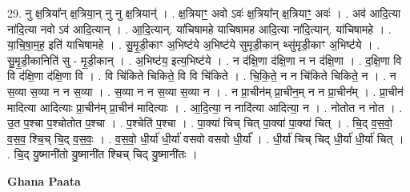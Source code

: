 \documentclass[17pt]{extarticle}
\begin{document}
29. नु क्ष॒त्रिया᳚न् क्ष॒त्रिया॒न् नु नु क्ष॒त्रियान्॑ । . क्ष॒त्रियाꣳ॒॒ अवो ऽवः॑ क्ष॒त्रिया᳚न् क्ष॒त्रियाꣳ॒॒ अवः॑ । . अव॑ आदि॒त्या ना॑दि॒त्या नवो ऽव॑ आदि॒त्यान् । . आ॒दि॒त्यान्. या॑चिषामहे याचिषामह आदि॒त्या ना॑दि॒त्यान्. या॑चिषामहे । . या॒चि॒षा॒म॒ह॒ इति॑ याचिषामहे । . सु॒मृ॒डी॒काꣳ अ॒भिष्ट॑ये अ॒भिष्ट॑ये सुमृडी॒कान् थ्सु॑मृडी॒काꣳ अ॒भिष्ट॑ये । . सु॒मृ॒डी॒कानिति॑ सु - मृ॒डी॒कान् । . अ॒भिष्ट॑य॒ इत्य॒भिष्ट॑ये । . न द॑क्षि॒णा द॑क्षि॒णा न न द॑क्षि॒णा । . द॒क्षि॒णा वि वि द॑क्षि॒णा द॑क्षि॒णा वि । . वि चि॑किते चिकिते॒ वि वि चि॑किते । . चि॒कि॒ते॒ न न चि॑किते चिकिते॒ न । . न स॒व्या स॒व्या न न स॒व्या । . स॒व्या न न स॒व्या स॒व्या न । . न प्रा॒चीन॑म् प्रा॒चीन॒म् न न प्रा॒चीन᳚म् । . प्रा॒चीन॑ मादित्या आदित्याः प्रा॒चीन॑म् प्रा॒चीन॑ मादित्याः । . आ॒दि॒त्या॒ न नादि॑त्या आदित्या॒ न । . नोतोत न नोत । . उ॒त प॒श्चा प॒श्चोतोत प॒श्चा । . प॒श्चेति॑ प॒श्चा । . पा॒क्या॑ चिच् चित् पा॒क्या॑ पा॒क्या॑ चित् । . चि॒द् व॒स॒वो॒ व॒स॒व॒ श्चि॒च् चि॒द् व॒स॒वः॒ । . व॒स॒वो॒ धी॒र्या॑ धी॒र्या॑ वसवो वसवो धी॒र्या᳚ । . धी॒र्या॑ चिच् चिद् धी॒र्या॑ धी॒र्या॑ चित् । . चि॒द् यु॒ष्मानी॑तो यु॒ष्मानी॑त श्चिच् चिद् यु॒ष्मानी॑तः । \newline

\textbf{Ghana Paata } \newline
\end{document}
